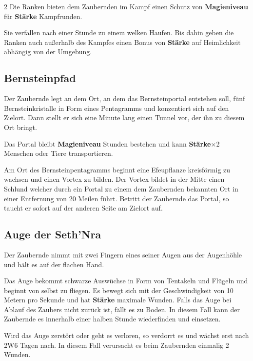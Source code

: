\begin{multicols*}{2}
Die Ranken bieten dem Zaubernden im Kampf einen Schutz von \textbf{Magieniveau} für \textbf{Stärke} Kampfrunden.

Sie verfallen nach einer Stunde zu einem welken Haufen. Bis dahin geben die Ranken auch außerhalb des Kampfes einen Bonus von \textbf{Stärke} auf Heimlichkeit abhängig von der Umgebung.



\subsection{Bernsteinpfad}

Der Zaubernde legt an dem Ort, an dem das Bernsteinportal entstehen soll, fünf Bernsteinkristalle in Form eines Pentagramms und konzentiert sich auf den Zielort. Dann stellt er sich eine Minute lang einen Tunnel vor, der ihn zu diesem Ort bringt.

Das Portal bleibt \textbf{Magieniveau} Stunden bestehen und kann \textbf{Stärke}×2 Menschen oder Tiere transportieren.

Am Ort des Bernsteinpentagramms beginnt eine Efeupflanze kreisförmig zu wachsen und einen Vortex zu bilden. Der Vortex bildet in der Mitte einen Schlund welcher durch ein Portal zu einem dem Zaubernden bekannten Ort in einer Entfernung von 20 Meilen führt. Betritt der Zaubernde das Portal, so taucht er sofort auf der anderen Seite am Zielort auf.



\subsection{Auge der Seth'Nra}

Der Zaubernde nimmt mit zwei Fingern eines seiner Augen aus der Augenhöhle und hält es auf der flachen Hand.

Das Auge bekommt schwarze Auswüchse in Form von Tentakeln und Flügeln und beginnt von selbst zu fliegen. Es bewegt sich mit der Geschwindigkeit von 10 Metern pro Sekunde und hat \textbf{Stärke} maximale Wunden. Falls das Auge bei Ablauf des Zaubers nicht zurück ist, fällt es zu Boden. In diesem Fall kann der Zaubernde es innerhalb einer halben Stunde wiederfinden und einsetzen.

Wird das Auge zerstört oder geht es verloren, so verdorrt es und wächst erst nach 2W6 Tagen nach. In diesem Fall verursacht es beim Zaubernden einmalig 2 Wunden.


\end{multicols*}
